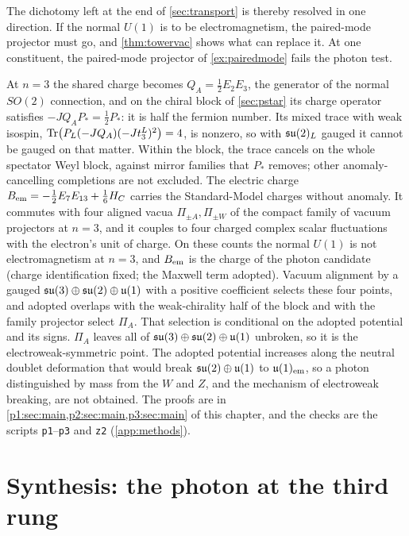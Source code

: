 The dichotomy left at the end of \cref{sec:transport} is thereby resolved in one direction. If the normal $U(1)$ is to be electromagnetism, the paired-mode projector
must go, and \cref{thm:towervac} shows what can replace it. At one constituent, the paired-mode projector of \cref{ex:pairedmode} fails the photon test.

\begin{remark}
\label{rem:photonn3}
At $n=3$ the shared charge becomes $Q_A=\tfrac12E_2E_3$, the generator of the normal $SO(2)$ connection, and on the chiral block of \cref{sec:pstar} its charge operator
satisfies $-JQ_AP_*=\tfrac12P_*$: it is half the fermion number. Its mixed trace with weak isospin, $\operatorname{Tr}\bigl(P_L(-JQ_A)(-Jt^L_3)^2\bigr)=4$, is nonzero, so with $\mathfrak{su}(2)_L$ gauged
it cannot be gauged on that matter. Within the block, the trace cancels on the whole spectator Weyl block, against mirror families that $P_*$ removes; other anomaly-cancelling
completions are not excluded. The electric charge
$B_{\rm em}=-\tfrac12E_7E_{13}+\tfrac16H_C$ carries the Standard-Model charges without anomaly. It commutes with four aligned vacua $\Pi_{\pm A},\Pi_{\pm W}$ of the compact
family of vacuum projectors at $n=3$, and it couples to four charged complex scalar fluctuations with the electron's unit of charge. On these counts the normal
$U(1)$ is not electromagnetism at $n=3$, and $B_{\rm em}$ is the charge of the photon candidate (charge identification fixed; the Maxwell term adopted). Vacuum alignment
by a gauged $\mathfrak{su}(3)\oplus\mathfrak{su}(2)\oplus\mathfrak{u}(1)$ with a positive coefficient selects these four points, and adopted overlaps with the weak-chirality half of the block and with
the family projector select $\Pi_A$. That selection is conditional on the adopted potential and its signs. $\Pi_A$ leaves all of $\mathfrak{su}(3)\oplus\mathfrak{su}(2)\oplus\mathfrak{u}(1)$ unbroken,
so it is the electroweak-symmetric point. The adopted potential increases along the neutral doublet deformation that would break $\mathfrak{su}(2)\oplus\mathfrak{u}(1)$ to
$\mathfrak{u}(1)_{\rm em}$, so a photon distinguished by mass from the $W$ and $Z$, and the mechanism of electroweak breaking, are not obtained. The proofs are in \cref{p1:sec:main,p2:sec:main,p3:sec:main} of this chapter, and the checks are the scripts \texttt{p1}--\texttt{p3} and \texttt{z2} (\cref{app:methods}).
\end{remark}


\section{Synthesis: the photon at the third rung}
\label{p5:sec:main}

